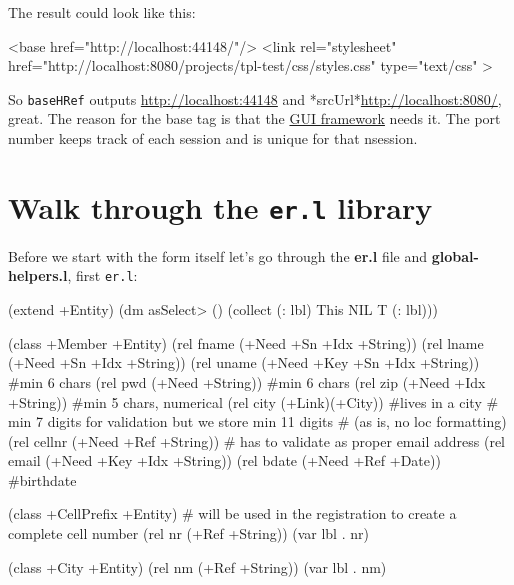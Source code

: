 The result could look like this:


\begin{wideverbatim}
<base href="http://localhost:44148/"/>
<link rel="stylesheet"
      href="http://localhost:8080/projects/tpl-test/css/styles.css" 
type="text/css" >
\end{wideverbatim}

So \texttt{baseHRef} outputs \href{http://localhost:44148}{http://localhost:44148} and
*srcUrl*\href{http://localhost:8080/}{http://localhost:8080/}, great. The reason for the base tag is
that the \href{http://software-lab.de/app.html}{GUI framework} needs it.
The port number keeps track of each session and is unique for that
nsession.


\section{Walk through the \texttt{er.l} library}
\label{sec:registration-form}

Before we start with the form itself let's go through the
\textbf{er.l} file and \textbf{global-helpers.l}, first \texttt{er.l}:

\begin{wideverbatim}
(extend +Entity)
(dm asSelect> ()
    (collect (: lbl) This NIL T (: lbl)))

(class +Member +Entity)
(rel fname    (+Need +Sn +Idx +String))
(rel lname    (+Need +Sn +Idx +String))
(rel uname    (+Need +Key +Sn +Idx +String))  #min 6 chars
(rel pwd      (+Need +String))                #min 6 chars
(rel zip      (+Need +Idx +String))           #min 5 chars, numerical
(rel city     (+Link)(+City))                 #lives in a city
# min 7 digits for validation but we store min 11 digits 
# (as is, no loc formatting)    
(rel cellnr   (+Need +Ref +String))  
# has to validate as proper email address
(rel email    (+Need +Key +Idx +String))     
(rel bdate    (+Need +Ref +Date))             #birthdate

\end{wideverbatim}

\begin{wideverbatim}

(class +CellPrefix +Entity)
# will be used in the registration to create a complete cell number
(rel nr (+Ref +String))
(var lbl . nr)

(class +City +Entity)
(rel nm (+Ref +String))
(var lbl . nm)
\end{wideverbatim}


